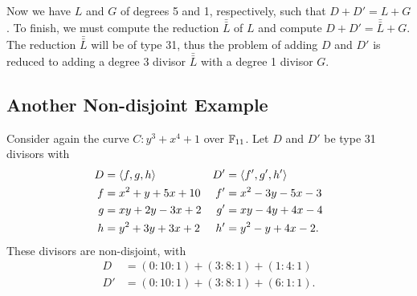 Now we have $L$ and $G$ of degrees 5 and 1, respectively, such that $D + D' = L + G$.
To finish, we must compute the reduction $\bar{\bar L}$ of $L$ and compute $D + D' = \bar{\bar L} + G$.
The reduction $\bar{\bar L}$ will be of type 31, thus the problem of adding $D$ and $D'$
is reduced to adding a degree 3 divisor $\bar{\bar L}$ with a degree 1 divisor $G$.




\subsection{Another Non-disjoint Example}

Consider again the curve $C : y^3 + x^4 + 1$ over $\mathbb{F}_{11}$.
Let $D$ and $D'$ be type 31 divisors with
\begin{align*}
  D  &= \left\langle f, g, h \right\rangle      & D' &= \left\langle f', g', h' \right\rangle  \\
  f  &= x^2 +  y + 5x + 10 & f' &= x^2 - 3y - 5x - 3 \\
  g  &=  xy + 2y - 3x + 2  & g' &=  xy - 4y + 4x - 4 \\
  h  &= y^2 + 3y + 3x + 2  & h' &= y^2 -  y + 4x - 2.\\
\end{align*}
These divisors are non-disjoint, with
\begin{align*}
  D  &= (0 : 10 : 1) + (3 : 8 : 1) + (1 : 4 : 1) \\
  D' &= (0 : 10 : 1) + (3 : 8 : 1) + (6 : 1 : 1).
\end{align*}

\begin{center}
\end{center}

